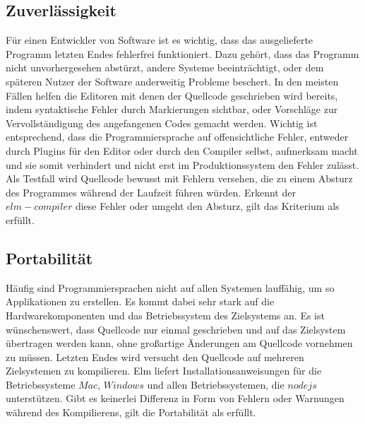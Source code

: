 \subsection{Zuverlässigkeit}
\label{sec:muster_zuverlaessigkeit}
Für einen Entwickler von Software ist es wichtig, dass das ausgelieferte Programm letzten Endes fehlerfrei funktioniert. Dazu gehört, dass das Programm nicht unvorhergesehen abstürzt, andere Systeme beeinträchtigt, oder dem späteren Nutzer der Software anderweitig Probleme beschert. In den meisten Fällen helfen die Editoren mit denen der Quellcode geschrieben wird bereits, indem syntaktische Fehler durch Markierungen sichtbar, oder Vorschläge zur Vervollständigung des angefangenen Codes gemacht werden. Wichtig ist entsprechend, dass die Programmiersprache auf offensichtliche Fehler, entweder durch Plugins für den Editor oder durch den Compiler selbst, aufmerksam macht und sie somit verhindert und nicht erst im Produktionssystem den Fehler zulässt. Als Testfall wird Quellcode bewusst mit Fehlern versehen, die zu einem Absturz des Programmes während der Laufzeit führen würden. Erkennt der $elm-compiler$ diese Fehler oder umgeht den Absturz, gilt das Kriterium als erfüllt.


\subsection{Portabilität}
\label{sec:muster_portabilitaet}
Häufig sind Programmiersprachen nicht auf allen Systemen lauffähig, um so Applikationen zu erstellen. Es kommt dabei sehr stark auf die Hardwarekomponenten und das Betriebssystem des Zielsystems an. Es ist wünschenswert, dass Quellcode nur einmal geschrieben und auf das Zielsystem übertragen werden kann, ohne großartige Änderungen am Quellcode vornehmen zu müssen. Letzten Endes wird versucht den Quellcode auf mehreren Zielsystemen zu kompilieren. Elm liefert Installationsanweisungen für die Betriebssysteme $Mac$, $Windows$ und allen Betriebssystemen, die $nodejs$ unterstützen. Gibt es keinerlei Differenz in Form von Fehlern oder Warnungen während des Kompilierens, gilt die Portabilität als erfüllt.


